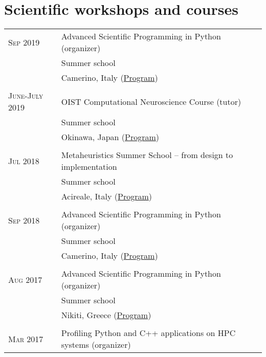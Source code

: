 \section{Scientific workshops and courses}
\begin{longtable}{>{\hfill}p{3.3cm}|p{12.0cm}}
  \textsc{Sep} 2019 & Advanced Scientific Programming in Python (organizer) \\
  & \footnotesize Summer school \\
  & \footnotesize Camerino, Italy  (\href{https://python.g-node.org/python-summerschool-2019/}{Program}) \\
  \multicolumn{2}{c}{} \\
  \textsc{June-July} 2019 & OIST Computational Neuroscience Course (tutor) \\
  & \footnotesize Summer school \\
  & \footnotesize Okinawa, Japan (\href{https://groups.oist.jp/ocnc/program-ocnc2019}{Program}) \\
  \multicolumn{2}{c}{} \\
  \textsc{Jul} 2018 & Metaheuristics Summer School -- from design to implementation\\
  & \footnotesize Summer school \\
                    & \footnotesize Acireale, Italy  (\href{https://www.ants-lab.it/mess2018/}{Program}) \\
  \multicolumn{2}{c}{} \\
  \textsc{Sep} 2018 & Advanced Scientific Programming in Python (organizer) \\
  & \footnotesize Summer school \\
  & \footnotesize Camerino, Italy  (\href{https://python.g-node.org/python-summerschool-2018/}{Program}) \\
  \multicolumn{2}{c}{} \\
  \textsc{Aug} 2017 & Advanced Scientific Programming in Python (organizer) \\
    & \footnotesize Summer school \\
                    & \footnotesize Nikiti, Greece  (\href{https://python.g-node.org/python-summerschool-2017/}{Program}) \\
  \multicolumn{2}{c}{} \\
  \textsc{Mar} 2017 & Profiling Python and C++ applications on HPC systems (organizer) \\

\end{longtable}
